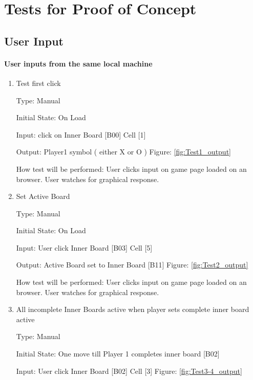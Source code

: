 \documentclass[12pt, titlepage]{article}
\begin{document}
\section{Tests for Proof of Concept} \label{POC}

\subsection{User Input}
		
\paragraph{User inputs from the same local machine}

\begin{enumerate}

\item{Test first click\\}

Type: Manual
					
Initial State: On Load
					
Input: click on Inner Board [B00] Cell [1] 
					
Output: Player1 symbol ( either X or O ) Figure: \ref{fig:Test1_output}
					
How test will be performed: User clicks input on game page loaded on an
browser. User watches for graphical response.

\item{Set Active Board\\}

Type: Manual
					
Initial State: On Load
					
Input: User click Inner Board [B03] Cell [5] 
					
Output:  Active Board set to Inner Board [B11] Figure: \ref{fig:Test2_output}
					
How test will be performed: User clicks input on game page loaded on an
browser. User watches for graphical response.


\item{All incomplete Inner Boards active when player sets complete inner board active \\}

Type: Manual
					
Initial State: One move till Player 1 completes inner board [B02]
					
Input: User click Inner Board [B02] Cell [3] Figure: \ref{fig:Test3-4_output}
					

\end{enumerate}
\end{document}
